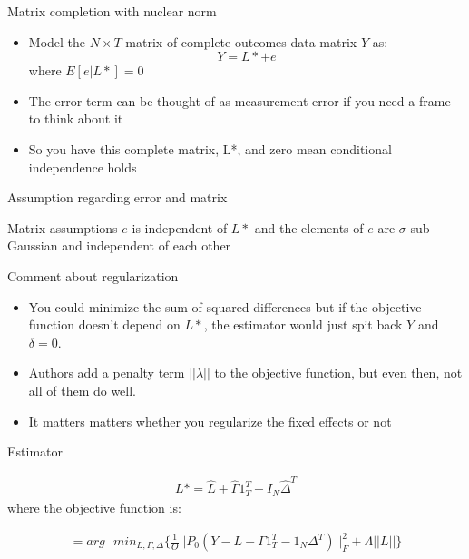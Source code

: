 \documentclass{beamer}
\begin{document}
\begin{frame}{Matrix completion with nuclear norm}

\begin{itemize}
\item Model the $N \times T$ matrix of complete outcomes data matrix $Y$ as: $$Y = L* + e$$where $E[e|L*]=0$
\item The error term can be thought of as measurement error if you need a frame to think about it
\item So you have this complete matrix, L*, and zero mean conditional independence holds
\end{itemize}

\end{frame}

\begin{frame}{Assumption regarding error and matrix}

\begin{block}{Matrix assumptions}
$e$ is independent of $L*$ and the elements of $e$ are $\sigma$-sub-Gaussian and independent of each other
\end{block}


\end{frame}

\begin{frame}{Comment about regularization}	
	
\begin{itemize}
\item You could minimize the sum of squared differences but if the objective function doesn't depend on $L*$, the estimator would just spit back $Y$ and $\delta=0$. 
\item Authors add a penalty term $||\lambda||$ to the objective function, but even then, not all of them do well. 
\item It matters matters whether you regularize the fixed effects or not 
\end{itemize}

\end{frame}

\begin{frame}{Estimator}

\begin{eqnarray*}
L* = \widehat{L} + \widehat{\Gamma}1_T^T + I_N\widehat{\Delta}^T
\end{eqnarray*}where the objective function is:

\begin{eqnarray*}
= arg\text{ }min_{L,\Gamma,\Delta} \bigg \{ \frac{1}{O} || P_0(Y-L-\Gamma 1_T^T - 1_N\Delta^T)||_F^2 + \Lambda||L|| \bigg \}
\end{eqnarray*}

\end{frame}
\end{document}
